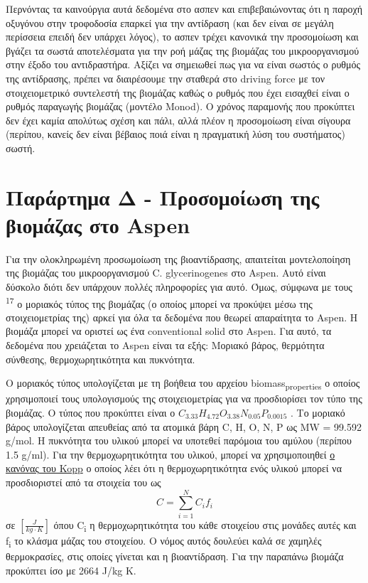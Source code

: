 \documentclass[11pt]{article}
\makeatletter
\newcommand{\citeprocitem}[2]{\hyper@linkstart{cite}{citeproc_bib_item_#1}#2\hyper@linkend}
\makeatother
\begin{document}
Περνόντας τα καινούργια αυτά δεδομένα στο ασπεν και επιβεβαιώνοντας ότι η παροχή οξυγόνου στην τροφοδοσία επαρκεί για την αντίδραση (και δεν είναι σε μεγάλη περίσσεια επειδή δεν υπάρχει λόγος), το ασπεν τρέχει κανονικά την προσομοίωση και βγάζει τα σωστά αποτελέσματα για την ροή μάζας της βιομάζας του μικροοργανισμού στην έξοδο του αντιδραστήρα. Αξίζει να σημειωθεί πως για να είναι σωστός ο ρυθμός της αντίδρασης, πρέπει να διαιρέσουμε την σταθερά στο driving force με τον στοιχειομετρικό συντελεστή της βιομάζας καθώς ο ρυθμός που έχει εισαχθεί είναι ο ρυθμός παραγωγής βιομάζας (μοντέλο Monod). Ο χρόνος παραμονής που προκύπτει δεν έχει καμία απολύτως σχέση και πάλι, αλλά πλέον η προσομοίωση είναι σίγουρα (περίπου, κανείς δεν είναι βέβαιος ποιά είναι η πραγματική λύση του συστήματος) σωστή. 

\section{Παράρτημα Δ - Προσομοίωση της βιομάζας στο Aspen}
\label{sec:org5be1ab3}
Για την ολοκληρωμένη προσωμοίωση της βιοαντίδρασης, απαιτείται μοντελοποίηση της βιομάζας του μικροοργανισμού C. glycerinogenes στο Aspen. Αυτό είναι δύσκολο διότι δεν υπάρχουν πολλές πληροφορίες για αυτό. Όμως, σύμφωνα με τους \textsuperscript{\citeprocitem{17}{17}} ο μοριακός τύπος της βιομάζας (ο οποίος μπορεί να προκύψει μέσω της στοιχειομετρίας της) αρκεί για όλα τα δεδομένα που θεωρεί απαραίτητα το Aspen. Η βιομάζα μπορεί να οριστεί ως ένα conventional solid στο Aspen. Για αυτό, τα δεδομένα που χρειάζεται το Aspen είναι τα εξής: Μοριακό βάρος, θερμότητα σύνθεσης, θερμοχωρητικότητα και πυκνότητα.

Ο μοριακός τύπος υπολογίζεται με τη βοήθεια του αρχείου biomass\textsubscript{properties} ο οποίος χρησιμοποιεί τους υπολογισμούς της στοιχειομετρίας για να προσδιορίσει τον τύπο της βιομάζας. Ο τύπος που προκύπτει είναι ο \(C_{3.33}H_{4.72}O_{3.38}N_{0.05}P_{0.0015}\) . Το μοριακό βάρος υπολογίζεται απευθείας από τα ατομικά βάρη C, H, O, N, P ως MW = 99.592 g/mol. Η πυκνότητα του υλικού μπορεί να υποτεθεί παρόμοια του αμύλου (περίπου 1.5 g/ml). Για την θερμοχωρητικότητα του υλικού, μπορεί να χρησιμοποιηθεί \href{https://en.wikipedia.org/wiki/Kopp\%27s\_law}{ο κανόνας του Kopp} ο οποίος λέει ότι η θερμοχωρητικότητα ενός υλικού μπορεί να προσδιοριστεί από τα στοιχεία του ως \[ C = \sum_{i=1}^{N} C_{i}f_i \] σε \(\left[ \frac{J}{kg \cdot K} \right]\) όπου C\textsubscript{i} η θερμοχωρητικότητα του κάθε στοιχείου στις μονάδες αυτές και f\textsubscript{i} το κλάσμα μάζας του στοιχείου. Ο νόμος αυτός δουλεύει καλά σε χαμηλές θερμοκρασίες, στις οποίες γίνεται και η βιοαντίδραση. Για την παραπάνω βιομάζα προκύπτει ίσο με 2664 J/kg K.
\end{document}
